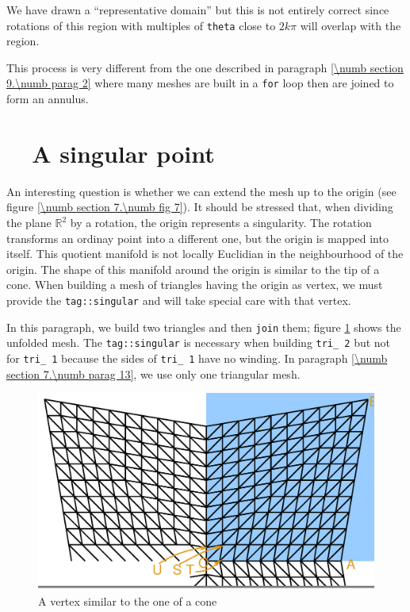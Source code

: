 We have drawn a ``representative domain'' but this is not entirely correct since
rotations of this region with multiples of {\small\tt theta} close to $ 2k\pi $
will overlap with the region.

This process is very different from the one described in paragraph
\ref{\numb section 9.\numb parag 2}
where many meshes are built in a {\small\tt for} loop then are joined to form an annulus.


\section{~~A singular point}\label{\numb section 7.\numb parag 12}

An interesting question is whether we can extend the mesh up to the origin
(see figure \ref{\numb section 7.\numb fig 7}).
It should be stressed that, when dividing the plane $ \mathbb{R}^2 $ by a rotation,
the origin represents a singularity.
The rotation transforms an ordinay point into a different one,
but the origin is mapped into itself.
This quotient manifold is not locally Euclidian in the neighbourhood of the origin.
The shape of this manifold around the origin is similar to the tip of a cone.
When building a mesh of triangles having the origin as vertex,
we must provide the {\small\tt\textcolor{tag}{tag}::singular}
and {\maniFEM} will take special care with that vertex.

In this paragraph, we build two triangles and then {\small\tt join} them;
figure \ref{\numb section 7.\numb fig 8} shows the unfolded mesh.
The {\small\tt\textcolor{tag}{tag}::singular} is necessary when building
{\small\tt tri\_\,2} but not for {\small\tt tri\_\,1}
because the sides of {\small\tt tri\_\,1} have no winding.
In paragraph \ref{\numb section 7.\numb parag 13}, we use only one triangular mesh.

\begin{figure}[ht] \centering
  \includegraphics[width=120mm]{butterfly.eps}
  \caption{A vertex similar to the one of a cone}
  \label{\numb section 7.\numb fig 8}
\end{figure}

